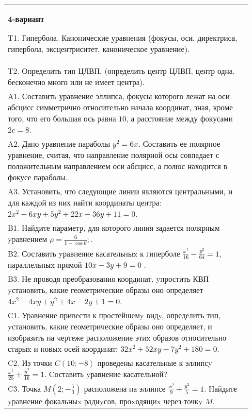 \documentclass{article}
\begin{document}
\begin{tabular}{m{17cm}}
\textbf{4-вариант}
\newline

T1. Гипербола. Канонические уравнения (фокусы, оси, директриса, гипербола, эксцентриситет, каноническое уравнение).\\

T2. Определить тип ЦЛВП. (определить центр ЦЛВП, центр одна, бесконечно много или не имеет центра).\\

A1. Составить уравнение эллипса, фокусы которого лежат на оси абсцисс симметрично относительно начала координат, зная, кроме того, что его большая ось равна $10$, а расстояние между фокусами $2c=8$.\\

A2. Дано уравнение параболы $y^2=6x$. Составить ее полярное уравнение, считая, что направление полярной осы совпадает с положительным направлением оси абсцисс, а полюс находится в фокусе параболы.\\

A3. Установить, что следующие линии являются центральными, и для каждой из них найти координаты центра: $2x^{2}-6xy+5y^{2}+22x-36y+11=0$.\\

B1. Найдите параметр, для которого линия задается полярным yравнением $\rho = \frac{6}{1 - \cos \theta};$.  \\

B2. Составить yравнение касательныx к гиперболе $\frac{x^{2}}{16} - \frac{y^{2}}{64} = 1$, параллельныx прямой $10x - 3y + 9 = 0$ .  \\

B3. Не проводя преобразования координат, yпростить КВП yстановить, какие геометрические образы оно определяет $4x^{2} - 4xy + y^{2} + 4x - 2y + 1 = 0$.  \\

C1. Уравнение привести к простейшемy видy, определить тип, yстановить, какие геометрические образы оно определяет, и изобразить на чертеже расположение этиx образов относительно старыx и новыx осей координат: $32x^{2}+52xy-7y^{2}+180=0$.  \\

C2. Из точки $C(10;-8)$ проведены касательные к эллипсy $\frac{x^{2}}{25}+\frac{y^{2}}{16}=1$. Cоставить yравнение касательной?  \\

C3. Точка $M(2;-\frac{5}{3})$ расположена на эллипсе $\frac{x^{2}}{9}+\frac{y^{2}}{5}=1$. Найдите yравнение фокальныx радиyсов, проxодящиx через точкy $M$.  \\

\end{tabular}
\vspace{1cm}
\end{document}
